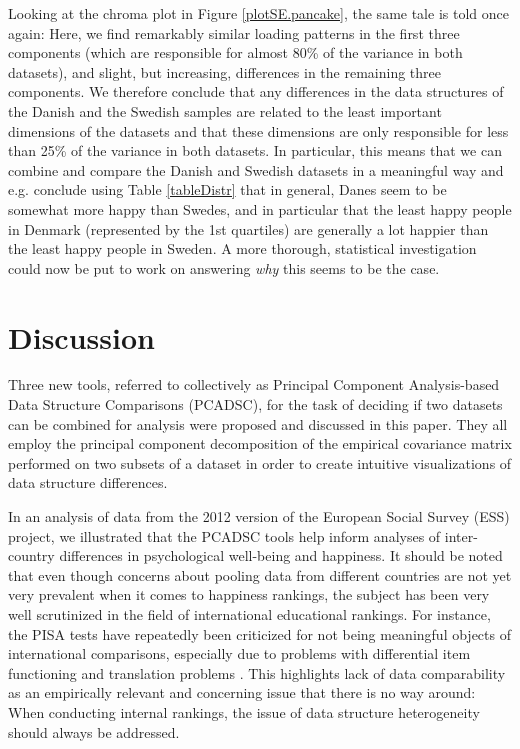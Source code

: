 \documentclass[titlepage,11pt,twoside]{article}
\begin{document}
Looking at the chroma plot in Figure \ref{plotSE.pancake}, the same tale is told once again: Here, we find remarkably similar loading patterns in the first three components (which are responsible for almost 80\% of the variance in both datasets), and slight, but increasing, differences in the remaining three components. We therefore conclude that any differences in the data structures of the Danish and the Swedish samples are related to the least important dimensions of the datasets and that these dimensions are only responsible for less than 25\% of the variance in both datasets. In particular, this means that we can combine and compare the Danish and Swedish datasets in a meaningful way and e.g. conclude using Table \ref{tableDistr} that in general, Danes seem to be somewhat more happy than Swedes, and in particular that the least happy people in Denmark (represented by the 1st quartiles) are generally a lot happier than the least happy people in Sweden. A more thorough, statistical investigation could now be put to work on answering \textit{why} this seems to be the case.

\section{Discussion}
\label{sec.Discussion}
Three new tools, referred to collectively as Principal Component Analysis-based Data Structure Comparisons (PCADSC), for the task of deciding if two datasets can be combined for analysis were proposed and discussed in this paper. They all employ the principal component decomposition of the empirical covariance matrix performed on two subsets of a dataset in order to create intuitive visualizations of data structure differences. %

In an analysis of data from the 2012 version of the European Social Survey (ESS) project, we illustrated that the PCADSC tools help inform analyses of inter-country differences in psychological well-being and happiness. It should be noted that even though concerns about pooling data from different countries are not yet very prevalent when it comes to happiness rankings, the subject has been very well scrutinized in the field of international educational rankings. For instance, the PISA tests have repeatedly been criticized for not being meaningful objects of international comparisons, especially due to problems with differential item functioning \citep{Kankaras2014,Kreiner2014,ZwitserEtAl2017} and translation problems \citep{Asil2016}. This highlights lack of data comparability as an empirically relevant and concerning issue that there is no way around: When conducting internal rankings, the issue of data structure heterogeneity should always be addressed. 
\end{document}
